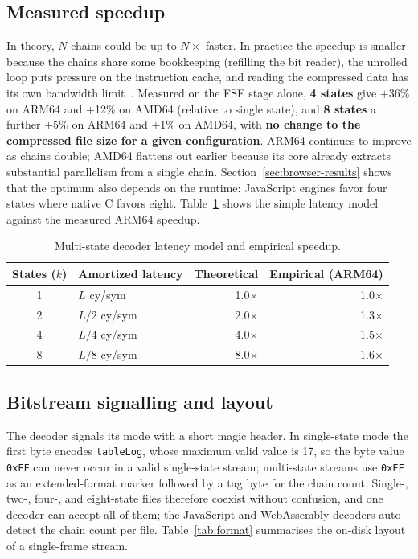 \documentclass[journal]{IEEEtran}
\begin{document}
\subsection{Measured speedup}

In theory, $N$ chains could be up to $N\times$ faster. In practice the
speedup is smaller because the chains share some bookkeeping (refilling the
bit reader), the unrolled loop puts pressure on the instruction cache, and
reading the compressed data has its own bandwidth
limit~\cite{williams2009}. Measured on the FSE stage alone, \textbf{4 states}
give $+$36\% on ARM64 and $+$12\% on AMD64 (relative to single state), and
\textbf{8 states} a further $+$5\% on ARM64 and $+$1\% on AMD64, with
\textbf{no change to the compressed file size for a given configuration}.
ARM64 continues to improve as chains double; AMD64 flattens out earlier
because its core already extracts substantial parallelism from a single
chain. Section~\ref{sec:browser-results} shows that the optimum also depends
on the runtime: JavaScript engines favor four states where native C favors
eight. Table~\ref{tab:latency} shows the simple latency model against the
measured ARM64 speedup.

\begin{table}[htbp]
\centering
\caption{Multi-state decoder latency model and empirical speedup.}
\label{tab:latency}
\begin{tabular}{clrr}
\toprule
States ($k$) & Amortized latency & Theoretical & Empirical (ARM64) \\
\midrule
1 & $L$ cy/sym & 1.0$\times$ & 1.0$\times$ \\
2 & $L/2$ cy/sym & 2.0$\times$ & 1.3$\times$ \\
4 & $L/4$ cy/sym & 4.0$\times$ & 1.5$\times$ \\
8 & $L/8$ cy/sym & 8.0$\times$ & 1.6$\times$ \\
\bottomrule
\end{tabular}
\end{table}

\subsection{Bitstream signalling and layout}

The decoder signals its mode with a short magic header. In single-state mode
the first byte encodes \texttt{tableLog}, whose maximum valid value is 17, so
the byte value \texttt{0xFF} can never occur in a valid single-state stream;
multi-state streams use \texttt{0xFF} as an extended-format marker followed
by a tag byte for the chain count. Single-, two-, four-, and eight-state
files therefore coexist without confusion, and one decoder can accept all of
them; the JavaScript and WebAssembly decoders auto-detect the chain count
per file. Table~\ref{tab:format} summarises the on-disk layout of a
single-frame stream.
\end{document}

